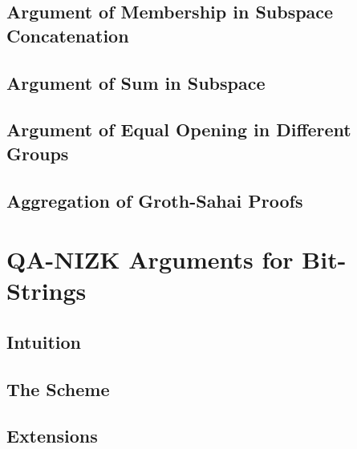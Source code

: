     

    \section{Argument of Membership in Subspace Concatenation}\label{sec:concat}

        

    \section{Argument of Sum in Subspace}\label{sec:sum}
        
        

    \section{Argument of Equal Opening in Different Groups} \label{sec:aggcommit}

         

    \section{Aggregation of Groth-Sahai Proofs}\label{sec:agg-gs}

        

\chapter {QA-NIZK Arguments for Bit-Strings} \label{sec:bits}
 
    

    \section{Intuition} \label{sec:bits-intuition}

         

    \section{The Scheme} \label{sec:bits-scheme}

        

    \section{Extensions} \label{sec:bits-extensions}

